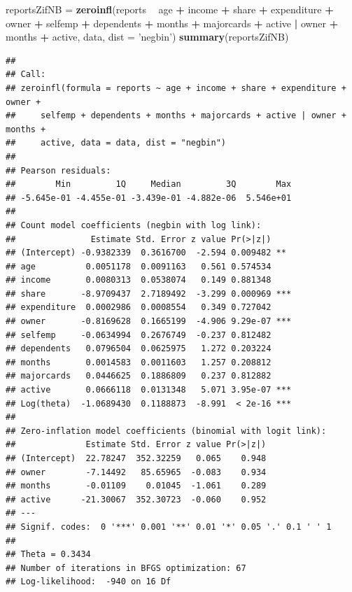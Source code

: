 \documentclass[
]{article}
\newenvironment{Shaded}{\begin{snugshade}}{\end{snugshade}}
\newcommand{\DataTypeTok}[1]{\textcolor[rgb]{0.13,0.29,0.53}{#1}}
\newcommand{\KeywordTok}[1]{\textcolor[rgb]{0.13,0.29,0.53}{\textbf{#1}}}
\newcommand{\NormalTok}[1]{#1}
\newcommand{\OperatorTok}[1]{\textcolor[rgb]{0.81,0.36,0.00}{\textbf{#1}}}
\newcommand{\StringTok}[1]{\textcolor[rgb]{0.31,0.60,0.02}{#1}}
\begin{document}
\begin{Shaded}
\begin{Highlighting}[]
\NormalTok{reportsZifNB =}\StringTok{ }\KeywordTok{zeroinfl}\NormalTok{(reports }\OperatorTok{~}\StringTok{ }\NormalTok{age }\OperatorTok{+}\StringTok{ }\NormalTok{income }\OperatorTok{+}\StringTok{ }\NormalTok{share }\OperatorTok{+}\StringTok{ }\NormalTok{expenditure }\OperatorTok{+}\StringTok{ }\NormalTok{owner }\OperatorTok{+}\StringTok{ }
\StringTok{                          }\NormalTok{selfemp }\OperatorTok{+}\StringTok{ }\NormalTok{dependents }\OperatorTok{+}\StringTok{ }\NormalTok{months }\OperatorTok{+}\StringTok{ }\NormalTok{majorcards }\OperatorTok{+}\StringTok{ }\NormalTok{active }\OperatorTok{|}\StringTok{ }
\StringTok{                          }\NormalTok{owner }\OperatorTok{+}\StringTok{ }\NormalTok{months }\OperatorTok{+}\StringTok{ }\NormalTok{active, data, }\DataTypeTok{dist =} \StringTok{'negbin'}\NormalTok{)}
\KeywordTok{summary}\NormalTok{(reportsZifNB)}
\end{Highlighting}
\end{Shaded}

\begin{verbatim}
## 
## Call:
## zeroinfl(formula = reports ~ age + income + share + expenditure + owner + 
##     selfemp + dependents + months + majorcards + active | owner + months + 
##     active, data = data, dist = "negbin")
## 
## Pearson residuals:
##        Min         1Q     Median         3Q        Max 
## -5.645e-01 -4.455e-01 -3.439e-01 -4.882e-06  5.546e+01 
## 
## Count model coefficients (negbin with log link):
##               Estimate Std. Error z value Pr(>|z|)    
## (Intercept) -0.9382339  0.3616700  -2.594 0.009482 ** 
## age          0.0051178  0.0091163   0.561 0.574534    
## income       0.0080313  0.0538074   0.149 0.881348    
## share       -8.9709437  2.7189492  -3.299 0.000969 ***
## expenditure  0.0002986  0.0008554   0.349 0.727042    
## owner       -0.8169628  0.1665199  -4.906 9.29e-07 ***
## selfemp     -0.0634994  0.2676749  -0.237 0.812482    
## dependents   0.0796504  0.0625975   1.272 0.203224    
## months       0.0014583  0.0011603   1.257 0.208812    
## majorcards   0.0446625  0.1886809   0.237 0.812882    
## active       0.0666118  0.0131348   5.071 3.95e-07 ***
## Log(theta)  -1.0689430  0.1188873  -8.991  < 2e-16 ***
## 
## Zero-inflation model coefficients (binomial with logit link):
##              Estimate Std. Error z value Pr(>|z|)
## (Intercept)  22.78247  352.32259   0.065    0.948
## owner        -7.14492   85.65965  -0.083    0.934
## months       -0.01109    0.01045  -1.061    0.289
## active      -21.30067  352.30723  -0.060    0.952
## ---
## Signif. codes:  0 '***' 0.001 '**' 0.01 '*' 0.05 '.' 0.1 ' ' 1 
## 
## Theta = 0.3434 
## Number of iterations in BFGS optimization: 67 
## Log-likelihood:  -940 on 16 Df
\end{verbatim}
\end{document}
